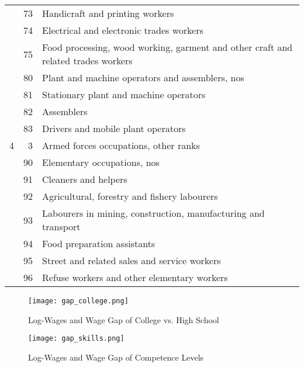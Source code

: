 \documentclass[]{article}
\begin{document}
\begin{table}[H]
\begin{tabular}{rrp{20em}}
                                         & 73    & Handicraft and printing workers \\
                                         & 74    & Electrical and electronic trades workers \\
                                         & 75    & Food processing, wood working, garment and other craft and related trades workers \\
                                         & 80    & Plant and machine operators and assemblers, nos \\
                                         & 81    & Stationary plant and machine operators \\
                                         & 82    & Assemblers \\
                                         & 83    & Drivers and mobile plant operators \\
    \midrule
    4     & 3     & Armed forces occupations, other ranks \\
                                         & 90    & Elementary occupations, nos \\
                                         & 91    & Cleaners and helpers \\
                                         & 92    & Agricultural, forestry and fishery labourers \\
                                         & 93    & Labourers in mining, construction, manufacturing and transport \\
                                         & 94    & Food preparation assistants \\
                                         & 95    & Street and related sales and service workers \\
                                         & 96    & Refuse workers and other elementary workers \\
    \bottomrule
  \end{tabular}%
  \label{tab:occupations_low}%
\end{table}%


\begin{figure}[H]
  \centering
  \texttt{[image: gap\_college.png]}
  \caption{Log-Wages and Wage Gap of College vs. High School}
  \label{fig:gap_college}
\end{figure}

\begin{figure}[H]
  \centering
  \texttt{[image: gap\_skills.png]}
  \caption{Log-Wages and Wage Gap of Competence Levels}
  \label{fig:gap_skills}
\end{figure}
\end{document}
